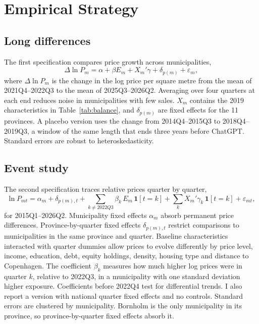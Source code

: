 \documentclass[12pt]{article}
\begin{document}
\section{Empirical Strategy}\label{sec:strategy}

\subsection{Long differences}

The first specification compares price growth across municipalities,
\begin{equation}\label{eq:longdiff}
\Delta \ln P_m = \alpha + \beta E_m + X_m'\gamma + \delta_{p(m)} + \varepsilon_m,
\end{equation}
where $\Delta \ln P_m$ is the change in the log price per square metre from the mean of 2021Q4--2022Q3 to the mean of 2025Q3--2026Q2. Averaging over four quarters at each end reduces noise in municipalities with few sales. $X_m$ contains the 2019 characteristics in Table~\ref{tab:balance}, and $\delta_{p(m)}$ are fixed effects for the 11 provinces. A placebo version uses the change from 2014Q4--2015Q3 to 2018Q4--2019Q3, a window of the same length that ends three years before ChatGPT. Standard errors are robust to heteroskedasticity.

\subsection{Event study}

The second specification traces relative prices quarter by quarter,
\begin{equation}\label{eq:es}
\ln P_{mt} = \alpha_m + \delta_{p(m),t} + \sum_{k \neq 2022Q3} \beta_k \, E_m \, \mathbf{1}[t = k] + \sum_k X_m'\gamma_k \, \mathbf{1}[t = k] + \varepsilon_{mt},
\end{equation}
for 2015Q1--2026Q2. Municipality fixed effects $\alpha_m$ absorb permanent price differences. Province-by-quarter fixed effects $\delta_{p(m),t}$ restrict comparisons to municipalities in the same province and quarter. Baseline characteristics interacted with quarter dummies allow prices to evolve differently by price level, income, education, debt, equity holdings, density, housing type and distance to Copenhagen. The coefficient $\beta_k$ measures how much higher log prices were in quarter $k$, relative to 2022Q3, in a municipality with one standard deviation higher exposure. Coefficients before 2022Q4 test for differential trends. I also report a version with national quarter fixed effects and no controls. Standard errors are clustered by municipality. Bornholm is the only municipality in its province, so province-by-quarter fixed effects absorb it.
\end{document}
